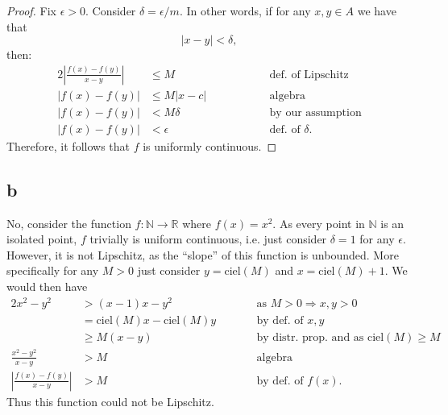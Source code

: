 \documentclass[10pt]{article}
\begin{document}
\begin{proof}
    Fix $\epsilon>0.$ Consider $\delta = \epsilon/m.$ In other words, if for any $x,y\in A$ we have that
    \begin{equation*}
        |x-y|<\delta,
    \end{equation*}
    then:
    \begin{alignat*}{2}
        \left | \frac{f(x)-f(y)}{x-y} \right | &\le M &&\text{def. of Lipschitz}\\
        |f(x)-f(y)| &\le M |x-c| \qquad\qquad&&\text{algebra}\\
        |f(x)-f(y)| &< M\delta &&\text{by our assumption}\\
        |f(x)-f(y)| &< \epsilon &&\text{def. of }\delta.
    \end{alignat*}
    Therefore, it follows that $f$ is uniformly continuous.
\end{proof}
\subsection*{b}

No, consider the function $f:\mathbb{N}\to\mathbb{R}$ where $f(x)=x^2.$ As every point in $\mathbb{N}$ is an isolated point, $f$ trivially is uniform continuous, i.e. just consider $\delta=1$ for any $\epsilon.$ However, it is not Lipschitz, as the ``slope'' of this function is unbounded. More specifically for any $M>0$ just consider $y=\text{ciel}(M)$ and $x=\text{ciel}(M)+1.$ We would then have
\begin{alignat*}{2}
    x^2-y^2&> (x-1)x - y^2 &&\text{as }M>0\Rightarrow x,y>0\\
    &=\text{ciel}(M)x-\text{ciel}(M)y \qquad&&\text{by def. of }x,y\\
    &\ge M(x-y) &&\text{by distr. prop. and as ciel}(M)\ge M\\
    \frac{x^2-y^2}{x-y} &> M &&\text{algebra}\\
    \left |\frac{f(x)-f(y)}{x-y} \right | &> M &&\text{by def. of }f(x).
\end{alignat*}
Thus this function could not be Lipschitz.
\end{document}
